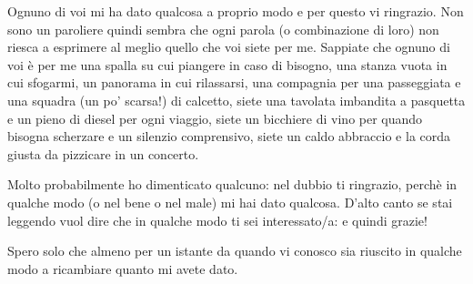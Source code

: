 \vspace{0.5em}
Ognuno di voi mi ha dato qualcosa a proprio modo e per questo vi ringrazio. Non sono un paroliere quindi sembra che ogni parola (o combinazione di loro) non riesca a esprimere al meglio quello che voi siete per me. Sappiate che ognuno di voi è per me una spalla su cui piangere in caso di bisogno, una stanza vuota in cui sfogarmi, un panorama in cui rilassarsi, una compagnia per una passeggiata e una squadra (un po' scarsa!) di calcetto, siete una tavolata imbandita a pasquetta e un pieno di diesel per ogni viaggio, siete un bicchiere di vino per quando bisogna scherzare e un silenzio comprensivo, siete un caldo abbraccio e la corda giusta da pizzicare in un concerto. 

Molto probabilmente ho dimenticato qualcuno: nel dubbio ti ringrazio, perchè in qualche modo (o nel bene o nel male) mi hai dato qualcosa. D'alto canto se stai leggendo vuol dire che in qualche modo ti sei interessato/a: e quindi grazie!

Spero solo che almeno per un istante da quando vi conosco sia riuscito in qualche modo a ricambiare quanto mi avete dato.